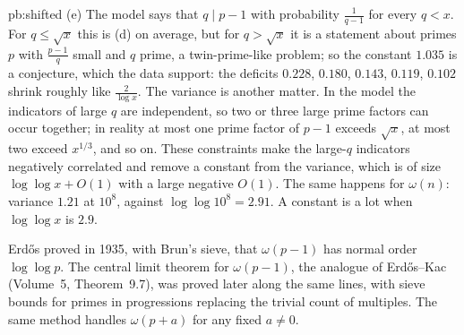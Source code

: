 \begin{solution}{pb:shifted}
(e) The model says that $q\mid p-1$ with probability $\frac1{q-1}$ for every $q<x$. For $q\le\sqrt x$ this is (d) on average, but for $q>\sqrt x$ it is a statement about primes $p$
with $\frac{p-1}q$ small and $q$ prime, a twin-prime-like problem; so the constant $1.035$ is a conjecture, which the data support: the deficits $0.228$, $0.180$, $0.143$, $0.119$,
$0.102$ shrink roughly like $\frac2{\log x}$. The variance is another matter. In the model the indicators of large $q$ are independent, so two or three large prime factors can
occur together; in reality at most one prime factor of $p-1$ exceeds $\sqrt x$, at most two exceed $x^{1/3}$, and so on. These constraints make the large-$q$ indicators negatively
correlated and remove a constant from the variance, which is of size $\log\log x+O(1)$ with a large negative $O(1)$. The same happens for $\omega(n)$: variance $1.21$ at $10^8$,
against $\log\log10^8=2.91$. A constant is a lot when $\log\log x$ is $2.9$.


\leads Erd\H os proved in 1935, with Brun's sieve, that $\omega(p-1)$ has normal order $\log\log p$. The central limit theorem for $\omega(p-1)$, the analogue of Erd\H os--Kac
(Volume~5, Theorem~9.7), was proved later along the same lines, with sieve bounds for primes in progressions replacing the trivial count of multiples. The same method handles $\omega(p+a)$ for any fixed $a\ne0$.
\end{solution}

